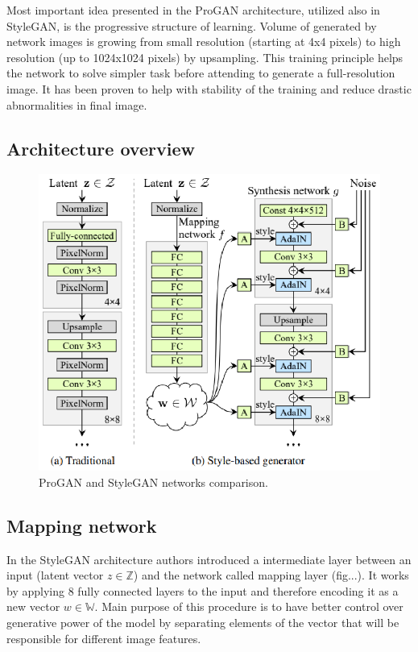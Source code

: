 \documentclass[12pt,a4paper,openany]{book}
\begin{document}
Most important idea presented in the ProGAN architecture, utilized also in StyleGAN, is the progressive structure of learning. Volume of generated by network images is growing from small resolution (starting at 4x4 pixels) to high resolution (up to 1024x1024 pixels) by upsampling. This training principle helps the network to solve simpler task before attending to generate a full-resolution image. It has been proven to help with stability of the training and reduce drastic abnormalities in final image.

\subsection{Architecture overview}

\begin{figure}[ht!]
    \centering
    \includegraphics[scale=1.5]{figs/stylegan-scheme.eps}
    \caption{ProGAN and StyleGAN networks comparison.}\label{Fig:STYLEGAN}
\end{figure}


\subsection{Mapping network}

In the StyleGAN architecture authors introduced a intermediate layer between an input (latent vector $z \in \mathbb{Z}$) and the network called mapping layer (fig...). It works by applying 8 fully connected layers to the input and therefore encoding it as a new vector $w \in \mathbb{W}$. Main purpose of this procedure is to have better control over generative power of the model by separating elements of the vector that will be responsible for different image features.
\end{document}
